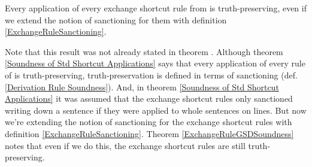 \begin{THEOREM}{}
Every application of every exchange shortcut rule from \GSDP{} is truth-preserving, even if we extend the notion of sanctioning for them with definition \ref{ExchangeRuleSanctioning}. 
\end{THEOREM} 
\noindent{}Note that this result was not already stated in theorem . 
Although theorem \ref{Soundness of Std Shortcut Applications} says that every application of every rule of \GSDP{} is truth-preserving, truth-preservation is defined in terms of sanctioning (def. \ref{Derivation Rule Soundness}).
And, in theorem \ref{Soundness of Std Shortcut Applications} it was assumed that the exchange shortcut rules only sanctioned writing down a sentence if they were applied to whole sentences on lines. 
But now we're extending the notion of sanctioning for the exchange shortcut rules with definition \ref{ExchangeRuleSanctioning}. 
Theorem \ref{ExchangeRuleGSDSoundness} notes that even if we do this, the exchange shortcut rules are still truth-preserving.

